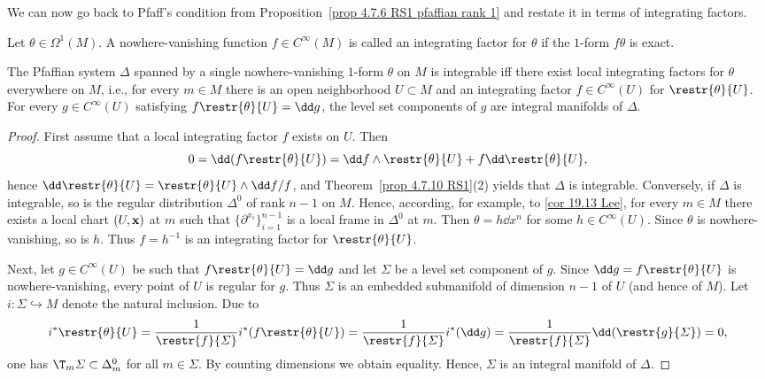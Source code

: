 We can now go back to Pfaff's condition from Proposition~\ref{prop 4.7.6 RS1 pfaffian rank 1} and restate it in terms of integrating factors.

\begin{defn}
    Let $\theta\in\Omega^1(M)$. A nowhere-vanishing function $f\in C^\infty(M)$ is called an integrating factor for $\theta$ if the $1$-form $f\theta$ is exact.
\end{defn}

\begin{prop}[{{\cite[Prop.~4.7.13]{RS1}}}]\label{prop 4.7.13 RS1}
    The Pfaffian system $\Delta$ spanned by a single nowhere-vanishing $1$-form $\theta$ on $M$ is integrable iff there exist local integrating factors for $\theta$ everywhere on $M$, i.e., for every $m\in M$ there is an open neighborhood $U\subset M$ and an integrating factor $f\in C^\infty(U)$ for $\restr{\theta}{U}$. For every $g\in C^\infty(U)$ satisfying $f\restr{\theta}{U}=\dd g$, the level set components of $g$ are integral manifolds of $\Delta$.
\end{prop}
\begin{proof}
    First assume that a local integrating factor $f$ exists on $U$. Then 
    \[0=\dd(f\restr{\theta}{U})=\dd f\wedge\restr{\theta}{U}+f\dd\restr{\theta}{U},\]
    hence $\dd\restr{\theta}{U}=\restr{\theta}{U}\wedge \dd f/f$, and Theorem~\ref{prop 4.7.10 RS1}(2) yields that $\Delta$ is integrable. Conversely, if $\Delta$ is integrable, so is the regular distribution $\Delta^0$ of rank $n-1$ on $M$. Hence, according, for example, to \ref{cor 19.13 Lee}, for every $m\in M$ there exists a local chart $(U,\bf{x})$ at $m$ such that $\{\partial^{x_i}\}_{i=1}^{n-1}$ is a local frame in $\Delta^0$ at $m$. Then $\theta=h\dd x^n$ for some $h\in C^\infty(U)$. Since $\theta$ is nowhere-vanishing, so is $h$. Thus $f=h^{-1}$ is an integrating factor for $\restr{\theta}{U}$.

    Next, let $g\in C^\infty(U)$ be such that $f\restr{\theta}{U}=\dd g$ and let $\varSigma$ be a level set component of $g$. Since $\dd g=f\restr{\theta}{U}$ is nowhere-vanishing, every point of $U$ is regular for $g$. Thus $\varSigma$ is an embedded submanifold of dimension $n-1$ of $U$ (and hence of $M$). Let $i:\varSigma\hookrightarrow M$ denote the natural inclusion. Due to
    \[i^\ast\restr{\theta}{U}=\frac{1}{\restr{f}{\varSigma}}i^\ast(f\restr{\theta}{U})=\frac{1}{\restr{f}{\varSigma}}i^\ast(\dd g)=\frac{1}{\restr{f}{\varSigma}}\dd(\restr{g}{\varSigma})=0, \]
    one has $\T_m\varSigma\subset\Delta_m^0$ for all $m\in\varSigma$. By counting dimensions we obtain equality. Hence, $\varSigma$ is an integral manifold of $\Delta$.
\end{proof}


